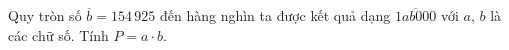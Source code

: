 \begin{ex}
Quy tròn số $\overline b=154\,925$ đến hàng nghìn ta được kết quả dạng $\overline{1ab000}$ với $a$, $b$ là các chữ số. Tính $P=a\cdot b$.
\end{ex}
